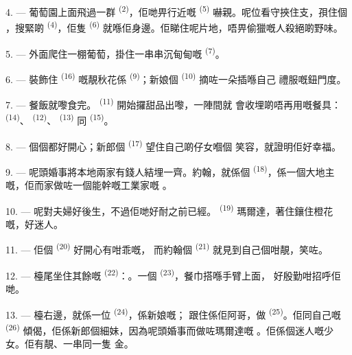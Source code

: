 4. --- 葡萄園上面飛過一群 \textsuperscript{(2)}，佢哋畀行近嘅
 \textsuperscript{(5)} 嚇親。呢位看守挾住支，孭住個
，搜緊啲 \textsuperscript{(4)}，佢隻
\textsuperscript{(6)} 就喺佢身邊。佢睇住呢片地，唔畀偷獵嘅人殺絕啲野味。

5. --- 外面爬住一棚葡萄，掛住一串串沉甸甸嘅
\textsuperscript{(7)}。

6. --- 裝飾住 \textsuperscript{(16)} 嘅靚秋花係
\textsuperscript{(9)}；新娘個 \textsuperscript{(10)} 摘咗一朵插喺自己
禮服嘅鈕門度。

7. --- 餐飯就嚟食完。 \textsuperscript{(11)} 開始攞甜品出嚟，一陣間就
會收埋啲唔再用嘅餐具： \textsuperscript{(14)}、
\textsuperscript{(12)}、 \textsuperscript{(13)} 同
\textsuperscript{(15)}。

\VUsaut{3.0mm}

8. --- 個個都好開心；新郎個 \textsuperscript{(17)} 望住自己啲仔女嗰個
笑容，就證明佢好幸福。

9. --- 呢頭婚事將本地兩家有錢人結埋一齊。約翰，就係個
\textsuperscript{(18)}，係一個大地主嘅，佢而家做咗一個能幹嘅工業家嘅
。

10. --- 呢對夫婦好後生，不過佢哋好耐之前已經。
\textsuperscript{(19)} 瑪爾達，著住鑲住橙花嘅，好迷人。

11. --- 佢個 \textsuperscript{(20)} 好開心有咁乖嘅，
而約翰個 \textsuperscript{(21)} 就見到自己個咁靚，笑咗。

12. --- 檯尾坐住其餘嘅 \textsuperscript{(22)}：。一個 \textsuperscript{(23)}，餐巾搭喺手臂上面，
好殷勤咁招呼佢哋。

\VUsaut{3.0mm}

13. --- 檯右邊，就係一位 \textsuperscript{(24)}，係新娘嘅；
跟住係佢阿哥，做 \textsuperscript{(25)}。佢同自己嘅
\textsuperscript{(26)} 傾偈，佢係新郎個細妹，因為呢頭婚事而做咗瑪爾達嘅
。佢係個迷人嘅少女。佢有靚、一串同一隻
金。

